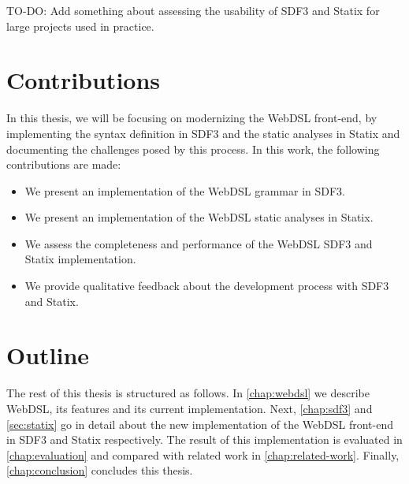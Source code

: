   TO-DO: Add something about assessing the usability of SDF3 and Statix for large projects used in practice.
  
  \section{\label{sec:contributions}Contributions}
    In this thesis, we will be focusing on modernizing the WebDSL front-end, by implementing the syntax definition in SDF3 and the static analyses in Statix and documenting the challenges posed by this process. In this work, the following contributions are made:

    \begin{itemize}
      \item We present an implementation of the WebDSL grammar in SDF3.
      \item We present an implementation of the WebDSL static analyses in Statix.
      \item We assess the completeness and performance of the WebDSL SDF3 and Statix implementation.
      \item We provide qualitative feedback about the development process with SDF3 and Statix.
    \end{itemize}

  \section{\label{sec:outline}Outline}
    The rest of this thesis is structured as follows. In \cref{chap:webdsl} we describe WebDSL, its features and its current implementation. Next, \cref{chap:sdf3} and \cref{sec:statix} go in detail about the new implementation of the WebDSL front-end in SDF3 and Statix respectively. The result of this implementation is evaluated in \cref{chap:evaluation} and compared with related work in \cref{chap:related-work}. Finally, \cref{chap:conclusion} concludes this thesis.
